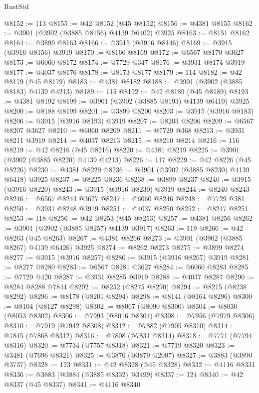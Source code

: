 \begin{lexlean}{RustStd}
\begin{coremodule}
@8152 := 113
@8155 := @42 @8152 (@45 @8152)
@8156 := @4381 @8155
@8162 := @3901 (@3902 (@3885 @8156) @4139 @6402) @3925
@8163 := @8151 @8162
@8164 := @3899 @8163
@8166 := @3915 (@3916 @8146)
@8169 := @3915 (@3916 @8156) @3919
@8170 := @8166 @8169
@8172 := @6567 @8170 @3627
@8173 := @6060 @8172
@8174 := @7729 @347
@8176 := @3931 @8174 @3919
@8177 := @4037 @8176
@8178 := @8173 @8177
@8179 := 114
@8182 := @42 @8179 (@45 @8179)
@8183 := @4381 @8182
@8188 := @3901 (@3902 (@3885 @8183) @4139 @4213)
@8189 := 115
@8192 := @42 @8189 (@45 @8189)
@8193 := @4381 @8192
@8199 := @3901 (@3902 (@3885 @8193) @4139 @6410) @3925
@8200 := @8188 @8199
@8201 := @3899 @8200
@8203 := @3915 (@3916 @8183)
@8206 := @3915 (@3916 @8193) @3919
@8207 := @8203 @8206
@8209 := @6567 @8207 @3627
@8210 := @6060 @8209
@8211 := @7729 @368
@8213 := @3931 @8211 @3919
@8214 := @4037 @8213
@8215 := @8210 @8214
@8216 := 116
@8219 := @42 @8216 (@45 @8216)
@8220 := @4381 @8219
@8225 := @3901 (@3902 (@3885 @8220) @4139 @4213)
@8226 := 117
@8229 := @42 @8226 (@45 @8226)
@8230 := @4381 @8229
@8236 := @3901 (@3902 (@3885 @8230) @4139 @6418) @3925
@8237 := @8225 @8236
@8238 := @3899 @8237
@8240 := @3915 (@3916 @8220)
@8243 := @3915 (@3916 @8230) @3919
@8244 := @8240 @8243
@8246 := @6567 @8244 @3627
@8247 := @6060 @8246
@8248 := @7729 @381
@8250 := @3931 @8248 @3919
@8251 := @4037 @8250
@8252 := @8247 @8251
@8253 := 118
@8256 := @42 @8253 (@45 @8253)
@8257 := @4381 @8256
@8262 := @3901 (@3902 (@3885 @8257) @4139 @3917)
@8263 := 119
@8266 := @42 @8263 (@45 @8263)
@8267 := @4381 @8266
@8273 := @3901 (@3902 (@3885 @8267) @4139 @6426) @3925
@8274 := @8262 @8273
@8275 := @3899 @8274
@8277 := @3915 (@3916 @8257)
@8280 := @3915 (@3916 @8267) @3919
@8281 := @8277 @8280
@8283 := @6567 @8281 @3627
@8284 := @6060 @8283
@8285 := @7729 @420
@8287 := @3931 @8285 @3919
@8288 := @4037 @8287
@8290 := @8284 @8288 @7844
@8292 := @8252 (@8275 @8290)
@8294 := @8215 (@8238 @8292)
@8296 := @8178 (@8201 @8294)
@8298 := @8141 (@8164 @8296)
@8300 := @8104 (@8127 @8298)
@8302 := @8067 (@8090 @8300)
@8304 := @8030 (@8053 @8302)
@8306 := @7993 (@8016 @8304)
@8308 := @7956 (@7979 @8306)
@8310 := @7919 (@7942 @8308)
@8312 := @7882 (@7905 @8310)
@8314 := @7845 (@7868 @8312)
@8316 := @7808 (@7831 @8314)
@8318 := @7771 (@7794 @8316)
@8320 := @7734 (@7757 @8318)
@8321 := @7719 @8320
@8323 := @3481 (@7696 @8321)
@8325 := @3876 (@3879 @2007)
@8327 := @3883 (@3890 @3737)
@8328 := 123
@8331 := @42 @8328 (@45 @8328)
@8332 := @4116 @8331
@8336 := @3883 (@3884 (@3885 @8332) @3499)
@8337 := 124
@8340 := @42 @8337 (@45 @8337)
@8341 := @4116 @8340

\end{coremodule}
\end{lexlean}
